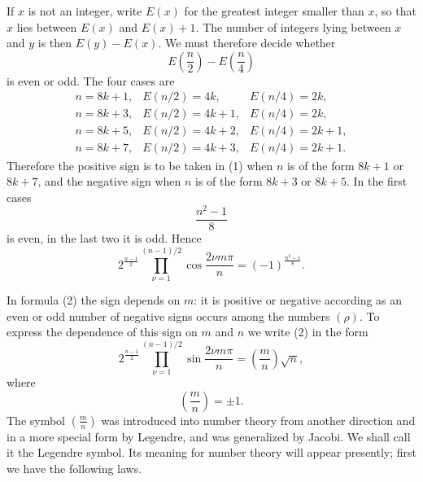 \documentclass[11pt]{article}
\begin{document}
If $x$ is not an integer, write $E(x)$ for the greatest integer smaller than $x$, so that $x$ lies between $E(x)$ and $E(x)+1$. The number of integers lying between $x$ and $y$ is then $E(y)-E(x)$. We must therefore decide whether
\[
        E\left(\frac n2\right)-E\left(\frac n4\right)
\]
is even or odd. The four cases are
\[
\begin{array}{lll}
 n=8k+1, & E(n/2)=4k,   & E(n/4)=2k,\\
 n=8k+3, & E(n/2)=4k+1, & E(n/4)=2k,\\
 n=8k+5, & E(n/2)=4k+2, & E(n/4)=2k+1,\\
 n=8k+7, & E(n/2)=4k+3, & E(n/4)=2k+1.
\end{array}
\]
Therefore the positive sign is to be taken in (1) when $n$ is of the form $8k+1$ or $8k+7$, and the negative sign when $n$ is of the form $8k+3$ or $8k+5$. In the first cases
\[
        \frac{n^2-1}{8}
\]
is even, in the last two it is odd. Hence
\[
\tag{3}
2^{\frac{n-1}{2}}\prod_{\nu=1}^{(n-1)/2}
       \cos\frac{2\nu m\pi}{n}
   =(-1)^{\frac{n^2-1}{8}}.
\]

In formula (2) the sign depends on $m$: it is positive or negative according as an even or odd number of negative signs occurs among the numbers $(\rho)$. To express the dependence of this sign on $m$ and $n$ we write (2) in the form
\[
\tag{4}
2^{\frac{n-1}{2}}\prod_{\nu=1}^{(n-1)/2}
       \sin\frac{2\nu m\pi}{n}
   =\left(\frac mn\right)\sqrt n,
\]
where
\[
        \left(\frac mn\right)=\pm1.
\]
The symbol $\left(\frac mn\right)$ was introduced into number theory from another direction and in a more special form by Legendre, and was generalized by Jacobi. We shall call it the Legendre symbol. Its meaning for number theory will appear presently; first we have the following laws.
\end{document}
